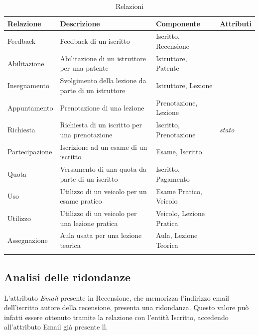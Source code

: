 \documentclass[10pt,twoside]{article}
\begin{document}
{    \begin{longtable}[H]{|>{\centering\arraybackslash}p{3cm}|
                            >{\centering\arraybackslash}p{3cm}|
                            >{\centering\arraybackslash}p{4.85cm}|
                            >{\centering\arraybackslash}p{3cm}|}
            \hline
            \rowcolor{lightgray!40}
            \textbf{Relazione} & \textbf{Descrizione} & \textbf{Componente} & \textbf{Attributi} \\
            \hline
            \rowcolor{white!40}
            Feedback & Feedback di un iscritto & Iscritto, Recensione & \\
            \hline
            \rowcolor{white!40}
            Abilitazione & Abilitazione di un istruttore per una patente & Istruttore, Patente & \\
            \hline
            \rowcolor{white!40}
            Insegnamento & Svolgimento della lezione da parte di un istruttore & Istruttore, Lezione & \\
            \hline
            \rowcolor{white!40}
            Appuntamento & Prenotazione di una lezione & Prenotazione, Lezione & \\
            \hline
            \rowcolor{white!40}
            Richiesta & Richiesta di un iscritto per una prenotazione & Iscritto, Prenotazione & \textit{stato}\\
            \hline
            \rowcolor{white!40}
            Partecipazione & Iscrizione ad un esame di un iscritto & Esame, Iscritto & \\
            \hline
            \rowcolor{white!40}
            Quota & Versamento di una quota da parte di un iscritto & Iscritto, Pagamento & \\
            \hline
            \rowcolor{white!40}
            Uso & Utilizzo di un veicolo per un esame pratico & Esame Pratico, Veicolo& \\
            \hline
            \rowcolor{white!40}
            Utilizzo & Utilizzo di un veicolo per una lezione pratica & Veicolo, Lezione Pratica & \\
            \hline
            \rowcolor{white!40}
            Assegnazione & Aula usata per una lezione teorica & Aula, Lezione Teorica & \\
            \hline
        \caption{Relazioni}
        \label{fig:tabellaRelazioni}
    \end{longtable}

    \subsection{Analisi delle ridondanze}{
        L’attributo \textit{Email} presente in Recensione, che memorizza l’indirizzo email dell’iscritto autore della recensione, presenta una ridondanza. Questo valore può infatti essere ottenuto tramite la relazione con l’entità Iscritto, accedendo all’attributo Email già presente lì.

}}
\end{document}
